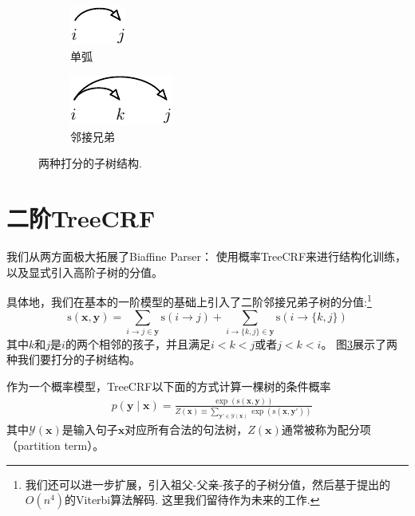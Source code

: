 \begin{figure}[tb]
	\centering
	\begin{subfigure}[b]{0.45\textwidth}
		\centering
		\includegraphics[scale=1.5]{figures/scoring-part/arc.pdf}
		\caption{单弧}
		\label{fig:scoring-part-arc}
	\end{subfigure}
	\begin{subfigure}[b]{0.45\textwidth}
		\centering
		\includegraphics[scale=1.5]{figures/scoring-part/sib.pdf}
		\caption{邻接兄弟}
		\label{fig:scoring-part-sib}
	\end{subfigure}
	\caption{两种打分的子树结构.}
	\label{fig:scoring-part}
\end{figure}

\section{二阶TreeCRF}\label{dep-2o-treecrf}
我们从两方面极大拓展了Biaffine Parser：
使用概率TreeCRF来进行结构化训练，以及显式引入高阶子树的分值。

具体地，我们在基本的一阶模型的基础上引入了二阶邻接兄弟子树的分值:\footnote{
	我们还可以进一步扩展，引入祖父-父亲-孩子的子树分值，然后基于\citet{koo-collins-2010-efficient}提出的$O(n^4)$的Viterbi算法解码.
	这里我们留待作为未来的工作.
}
\begin{equation}\label{eq:dep-2otree-score}
	\mathrm{s}(\boldsymbol{x}, \boldsymbol{y}) = \sum_{i\rightarrow j \in \boldsymbol{y}}\mathrm{s}(i\rightarrow j) + \sum_{
		i\rightarrow \{k,j\} \in \boldsymbol{y}
		} \mathrm{s}(i\rightarrow \{k,j\})
\end{equation}
其中$k$和$j$是$i$的两个相邻的孩子，并且满足$i < k < j$或者$j < k < i$。
图\ref{fig:scoring-part}展示了两种我们要打分的子树结构。

作为一个概率模型，TreeCRF以下面的方式计算一棵树的条件概率
\begin{equation}\label{eq:prob-labeled}
	\begin{split}
		& p(\boldsymbol{y}\mid\boldsymbol{x})  = \frac{\exp(\mathrm{s}(\boldsymbol{x},\boldsymbol{y}))}{Z(\boldsymbol{x}) \equiv \sum_{\boldsymbol{y'} \in \mathcal{Y}(\boldsymbol{x})} {\exp(\mathrm{s}(\boldsymbol{x},\boldsymbol{y'}))}}
	\end{split}
\end{equation}
其中$\mathcal{Y}(\boldsymbol{x})$是输入句子$\boldsymbol{x}$对应所有合法的句法树，$Z(\boldsymbol{x})$通常被称为配分项（partition term）。

